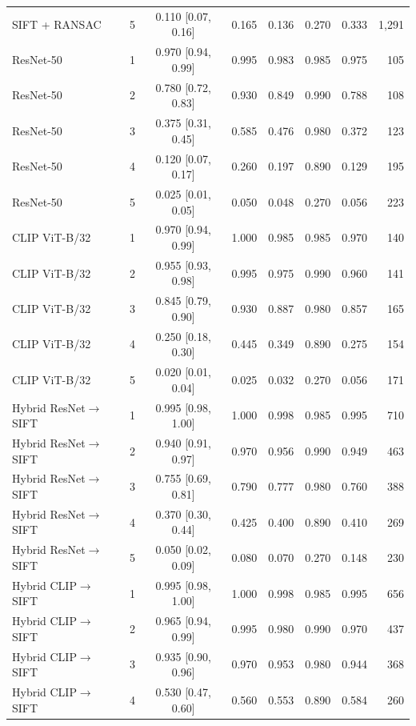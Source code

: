 \begin{table}[p]
\begin{tabular}{@{}llcccccr@{}}
SIFT + RANSAC & 5 & 0.110 {\scriptsize[0.07, 0.16]} & 0.165 & 0.136 & 0.270 & 0.333 & 1,291\\
ResNet-50 & 1 & 0.970 {\scriptsize[0.94, 0.99]} & 0.995 & 0.983 & 0.985 & 0.975 & 105\\
ResNet-50 & 2 & 0.780 {\scriptsize[0.72, 0.83]} & 0.930 & 0.849 & 0.990 & 0.788 & 108\\
ResNet-50 & 3 & 0.375 {\scriptsize[0.31, 0.45]} & 0.585 & 0.476 & 0.980 & 0.372 & 123\\
ResNet-50 & 4 & 0.120 {\scriptsize[0.07, 0.17]} & 0.260 & 0.197 & 0.890 & 0.129 & 195\\
ResNet-50 & 5 & 0.025 {\scriptsize[0.01, 0.05]} & 0.050 & 0.048 & 0.270 & 0.056 & 223\\
CLIP ViT-B/32 & 1 & 0.970 {\scriptsize[0.94, 0.99]} & 1.000 & 0.985 & 0.985 & 0.970 & 140\\
CLIP ViT-B/32 & 2 & 0.955 {\scriptsize[0.93, 0.98]} & 0.995 & 0.975 & 0.990 & 0.960 & 141\\
CLIP ViT-B/32 & 3 & 0.845 {\scriptsize[0.79, 0.90]} & 0.930 & 0.887 & 0.980 & 0.857 & 165\\
CLIP ViT-B/32 & 4 & 0.250 {\scriptsize[0.18, 0.30]} & 0.445 & 0.349 & 0.890 & 0.275 & 154\\
CLIP ViT-B/32 & 5 & 0.020 {\scriptsize[0.01, 0.04]} & 0.025 & 0.032 & 0.270 & 0.056 & 171\\
Hybrid ResNet$\to$SIFT & 1 & 0.995 {\scriptsize[0.98, 1.00]} & 1.000 & 0.998 & 0.985 & 0.995 & 710\\
Hybrid ResNet$\to$SIFT & 2 & 0.940 {\scriptsize[0.91, 0.97]} & 0.970 & 0.956 & 0.990 & 0.949 & 463\\
Hybrid ResNet$\to$SIFT & 3 & 0.755 {\scriptsize[0.69, 0.81]} & 0.790 & 0.777 & 0.980 & 0.760 & 388\\
Hybrid ResNet$\to$SIFT & 4 & 0.370 {\scriptsize[0.30, 0.44]} & 0.425 & 0.400 & 0.890 & 0.410 & 269\\
Hybrid ResNet$\to$SIFT & 5 & 0.050 {\scriptsize[0.02, 0.09]} & 0.080 & 0.070 & 0.270 & 0.148 & 230\\
Hybrid CLIP$\to$SIFT & 1 & 0.995 {\scriptsize[0.98, 1.00]} & 1.000 & 0.998 & 0.985 & 0.995 & 656\\
Hybrid CLIP$\to$SIFT & 2 & 0.965 {\scriptsize[0.94, 0.99]} & 0.995 & 0.980 & 0.990 & 0.970 & 437\\
Hybrid CLIP$\to$SIFT & 3 & 0.935 {\scriptsize[0.90, 0.96]} & 0.970 & 0.953 & 0.980 & 0.944 & 368\\
Hybrid CLIP$\to$SIFT & 4 & 0.530 {\scriptsize[0.47, 0.60]} & 0.560 & 0.553 & 0.890 & 0.584 & 260\\

\end{tabular}
\end{table}
